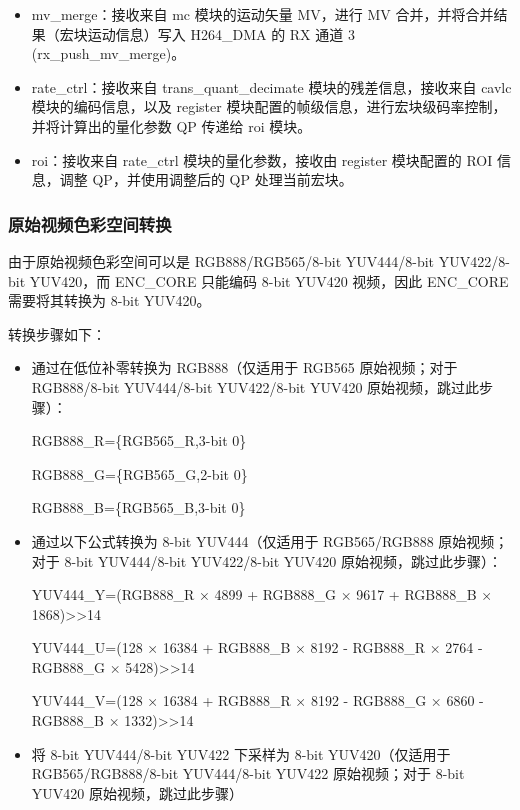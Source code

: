 \documentclass[main\_\_CN.tex]{subfiles}
\begin{document}
\begin{itemize}
    \item mv\_merge：接收来自 mc 模块的运动矢量 MV，进行 MV 合并，并将合并结果（宏块运动信息）写入 H264\_DMA 的 RX 通道 3 (rx\_push\_mv\_merge)。
    \item rate\_ctrl：接收来自 trans\_quant\_decimate 模块的残差信息，接收来自 cavlc 模块的编码信息，以及 register 模块配置的帧级信息，进行宏块级码率控制，并将计算出的量化参数 QP 传递给 roi 模块。
    \item roi：接收来自 rate\_ctrl 模块的量化参数，接收由 register 模块配置的 ROI 信息，调整 QP，并使用调整后的 QP 处理当前宏块。
\end{itemize}


\subsubsection{原始视频色彩空间转换}\label{sec:h264-csc}
由于原始视频色彩空间可以是 RGB888/RGB565/8-bit YUV444/8-bit YUV422/8-bit YUV420，而 ENC\_CORE 只能编码 8-bit YUV420 视频，因此 ENC\_CORE 需要将其转换为 8-bit YUV420。

转换步骤如下：
\begin{itemize}
    \item 通过在低位补零转换为 RGB888（仅适用于 RGB565 原始视频；对于 RGB888/8-bit YUV444/8-bit YUV422/8-bit YUV420 原始视频，跳过此步骤）：
    \begin{center}
        RGB888\_R=\{RGB565\_R,3-bit 0\}
    \end{center}
    \begin{center}
        RGB888\_G=\{RGB565\_G,2-bit 0\}
    \end{center}
    \begin{center}
        RGB888\_B=\{RGB565\_B,3-bit 0\}
    \end{center}
    \item 通过以下公式转换为 8-bit YUV444（仅适用于 RGB565/RGB888 原始视频；对于 8-bit YUV444/8-bit YUV422/8-bit YUV420 原始视频，跳过此步骤）：
    \begin{center}
        YUV444\_Y=(RGB888\_R × 4899 + RGB888\_G × 9617 + RGB888\_B × 1868)>>14
    \end{center}
    \begin{center}
        YUV444\_U=(128 × 16384 + RGB888\_B × 8192 - RGB888\_R × 2764 - RGB888\_G × 5428)>>14
    \end{center}
    \begin{center}
        YUV444\_V=(128 × 16384 + RGB888\_R × 8192 - RGB888\_G × 6860 - RGB888\_B × 1332)>>14
    \end{center}
    \item 将 8-bit YUV444/8-bit YUV422 下采样为 8-bit YUV420（仅适用于 RGB565/RGB888/8-bit YUV444/8-bit YUV422 原始视频；对于 8-bit YUV420 原始视频，跳过此步骤）
\end{itemize}
\end{document}
